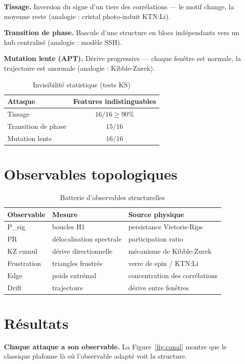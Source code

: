 \documentclass[11pt,twocolumn]{article}
\begin{document}
\textbf{Tissage.} Inversion du signe d'un tiers des corrélations --- le motif
change, la moyenne reste (analogie : cristal photo-induit KTN:Li).

\textbf{Transition de phase.} Bascule d'une structure en blocs indépendants
vers un hub centralisé (analogie : modèle SSH).

\textbf{Mutation lente (APT).} Dérive progressive --- chaque fenêtre est
normale, la trajectoire est anormale (analogie : Kibble-Zurek).

\begin{table}
\centering
\caption{Invisibilité statistique (tests KS)}
\label{tab:ks}
\begin{tabular}{@{}lc@{}}
\hline
Attaque & Features indistinguables \\
\hline
Tissage & $16/16 \geq 90\%$ \\
Transition de phase & $15/16$ \\
Mutation lente & $16/16$ \\
\hline
\end{tabular}
\end{table}

\section{Observables topologiques}
\begin{table}
\centering
\caption{Batterie d'observables structurelles}
\label{tab:obs}
\begin{tabular}{@{}lll@{}}
\hline
Observable & Mesure & Source physique \\
\hline
P\_sig & boucles H1 & persistance Vietoris-Rips \\
PR & délocalisation spectrale & participation ratio \\
KZ cumul & dérive directionnelle & mécanisme de Kibble-Zurek \\
Frustration & triangles frustrés & verre de spin / KTN:Li \\
Edge & poids extrémal & concentration des corrélations \\
Drift & trajectoire & dérive entre fenêtres \\
\hline
\end{tabular}
\end{table}

\section{Résultats}
\textbf{Chaque attaque a son observable.} La
Figure~\ref{fig:canal} montre que le classique plafonne là où l'observable
adapté voit la structure.
\end{document}
